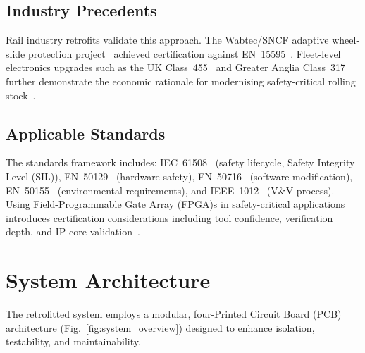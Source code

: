 \documentclass[journal, a4paper]{IEEEtran}
\newcommand{\VV}{V\&V}
\newif\iffirstFPGA  \firstFPGAtrue
\newcommand{\FPGA}{\iffirstFPGA Field-Programmable Gate Array (FPGA)\global\firstFPGAfalse\else FPGA\fi}
\newif\iffirstPCB   \firstPCBtrue
\newcommand{\PCB}{\iffirstPCB Printed Circuit Board (PCB)\global\firstPCBfalse\else PCB\fi}
\newif\iffirstSIL   \firstSILtrue
\newcommand{\SIL}{\iffirstSIL Safety Integrity Level (SIL)\global\firstSILfalse\else SIL\fi}
\begin{document}
\subsection{Industry Precedents}
Rail industry retrofits validate this approach. The Wabtec/SNCF adaptive wheel-slide protection project~\cite{wabtec_wsp_cert_2022} achieved certification against EN~15595~\cite{en15595_2018}. Fleet-level electronics upgrades such as the UK Class~455~\cite{rg_class455_upgrade_2013} and Greater Anglia Class~317~\cite{greater_anglia_refurb_2018} further demonstrate the economic rationale for modernising safety-critical rolling stock~\cite{carbon_infra_uic_2016}.

\subsection{Applicable Standards}
The standards framework includes: IEC~61508~\cite{iec61508_2010} (safety lifecycle, \SIL{}), EN~50129~\cite{en50129_2018} (hardware safety), EN~50716~\cite{en50716_2023} (software modification), EN~50155~\cite{en50155_2021} (environmental requirements), and IEEE~1012~\cite{ieee1012_2024} (\VV{} process). Using \FPGA{}s in safety-critical applications introduces certification considerations including tool confidence, verification depth, and IP core validation~\cite{guzman2011obsolescence,latifshabgahi2009redundancy}.

\section{System Architecture}
\label{sec:architecture}

The retrofitted system employs a modular, four-\PCB{} architecture (Fig.~\ref{fig:system_overview}) designed to enhance isolation, testability, and maintainability.
\end{document}
